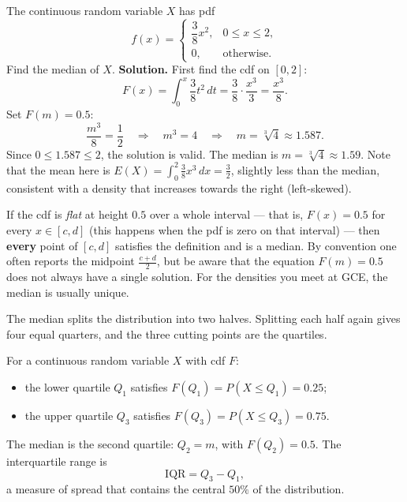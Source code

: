 \documentclass[11pt]{article}
\newcommand{\cle}[1]{{\popxbold\color{popdark}#1}}
\newcounter{popsec}
\newcounter{popsub}
\newcommand{\courssub}[1]{%
  \stepcounter{popsub}%
  \par\vspace{9pt}\noindent{\popxbold\fontsize{11.5}{13}\selectfont\color{popink}{\color{poporange}\thepopsec.\thepopsub}\hspace{6pt}#1}\par\nopagebreak\vspace{4pt}
}
\begin{document}
\begin{exoresolu}
The continuous random variable $X$ has pdf
\[ f(x) = \begin{cases} \dfrac{3}{8}x^{2}, & 0 \le x \le 2, \\ 0, & \text{otherwise}. \end{cases} \]
Find the median of $X$.
\tcblower
\textbf{Solution.} First find the cdf on $[0,2]$:
\[ F(x) = \int_{0}^{x} \frac{3}{8}t^{2}\,dt = \frac{3}{8}\cdot\frac{x^{3}}{3} = \frac{x^{3}}{8}. \]
Set $F(m) = 0.5$:
\[ \frac{m^{3}}{8} = \frac{1}{2} \quad\Longrightarrow\quad m^{3} = 4 \quad\Longrightarrow\quad m = \sqrt[3]{4} \approx 1.587. \]
Since $0 \le 1.587 \le 2$, the solution is valid. The median is $m = \sqrt[3]{4} \approx 1.59$. Note that the mean here is $E(X) = \int_0^2 \frac{3}{8}x^3\,dx = \frac{3}{2}$, slightly less than the median, consistent with a density that increases towards the right (left-skewed).
\end{exoresolu}

\begin{attention}
If the cdf is \emph{flat} at height $0.5$ over a whole interval --- that is, $F(x) = 0.5$ for every $x \in [c,d]$ (this happens when the pdf is zero on that interval) --- then \textbf{every} point of $[c,d]$ satisfies the definition and is a median. By convention one often reports the midpoint $\frac{c+d}{2}$, but be aware that the equation $F(m)=0.5$ does not always have a single solution. For the densities you meet at GCE, the median is usually unique.
\end{attention}

\courssub{Quartiles}

The median splits the distribution into two halves. Splitting each half again gives four equal quarters, and the three cutting points are the \cle{quartiles}.

\begin{definition}
For a continuous random variable $X$ with cdf $F$:
\begin{itemize}
\item the \cle{lower quartile} $Q_1$ satisfies $F(Q_1) = P(X \le Q_1) = 0.25$;
\item the \cle{upper quartile} $Q_3$ satisfies $F(Q_3) = P(X \le Q_3) = 0.75$.
\end{itemize}
The median is the second quartile: $Q_2 = m$, with $F(Q_2) = 0.5$. The \cle{interquartile range} is
\[ \mathrm{IQR} = Q_3 - Q_1, \]
a measure of spread that contains the central $50\%$ of the distribution.
\end{definition}
\end{document}
